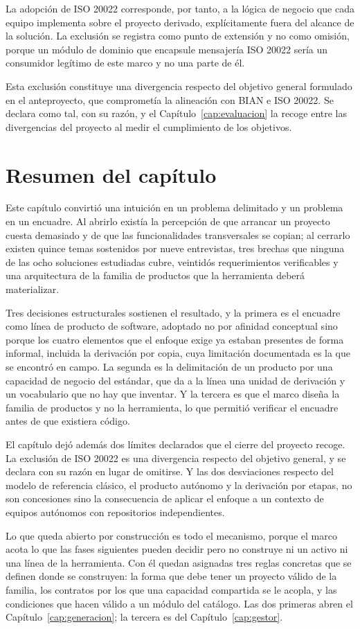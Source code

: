 La adopción de ISO 20022 corresponde, por tanto, a la lógica de negocio que
cada equipo implementa sobre el proyecto derivado, explícitamente fuera del
alcance de la solución. La exclusión se registra como punto de extensión y no
como omisión, porque un módulo de dominio que encapsule mensajería ISO 20022
sería un consumidor legítimo de este marco y no una parte de él.

Esta exclusión constituye una divergencia respecto del objetivo general
formulado en el anteproyecto, que comprometía la alineación con BIAN e ISO
20022. Se declara como tal, con su razón, y el Capítulo~\ref{cap:evaluacion}
la recoge entre las divergencias del proyecto al medir el cumplimiento de los
objetivos.

\section{Resumen del capítulo}

Este capítulo convirtió una intuición en un problema delimitado y un problema
en un encuadre. Al abrirlo existía la percepción de que arrancar un proyecto
cuesta demasiado y de que las funcionalidades transversales se copian; al
cerrarlo existen quince temas sostenidos por nueve entrevistas, tres
brechas que ninguna de las ocho soluciones estudiadas cubre, veintidós
requerimientos verificables y una arquitectura de la familia de productos que
la herramienta deberá materializar.

Tres decisiones estructurales sostienen el resultado, y la primera es el
encuadre como línea de producto de software, adoptado no por afinidad
conceptual sino porque los cuatro elementos que el enfoque exige ya estaban
presentes de forma informal, incluida la derivación por copia, cuya
limitación documentada es la que se encontró en campo. La segunda es la
delimitación de un producto por una capacidad de negocio del estándar, que da
a la línea una unidad de derivación y un vocabulario que no hay que inventar.
Y la tercera es que el marco diseña la familia de productos y no la
herramienta, lo que permitió verificar el encuadre antes de que existiera
código.

El capítulo dejó además dos límites declarados que el cierre del proyecto
recoge. La exclusión de ISO 20022 es una divergencia respecto del objetivo
general, y se declara con su razón en lugar de omitirse. Y las dos
desviaciones respecto del modelo de referencia clásico, el producto autónomo
y la derivación por etapas, no son concesiones sino la consecuencia de
aplicar el enfoque a un contexto de equipos autónomos con repositorios
independientes.

Lo que queda abierto por construcción es todo el mecanismo, porque el marco
acota lo que las fases siguientes pueden decidir pero no construye ni un
activo ni una línea de la herramienta. Con él quedan asignadas tres reglas
concretas que se definen donde se construyen: la forma que debe tener un
proyecto válido de la familia, los contratos por los que una capacidad
compartida se le acopla, y las condiciones que hacen válido a un módulo del
catálogo. Las dos primeras abren el Capítulo~\ref{cap:generacion}; la tercera
es del Capítulo~\ref{cap:gestor}.
